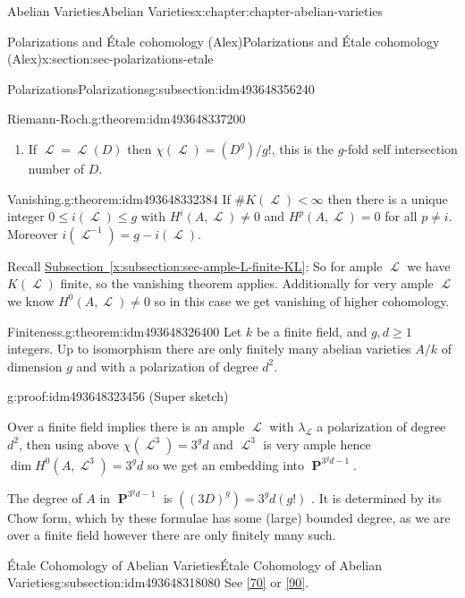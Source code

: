\documentclass[oneside,10pt,]{book}
\numberwithin{equation}{section}
\newcommand{\sheaf}[1]{\operatorname{\mathcal{#1}}}
\DeclareMathOperator{\PP}{\mathbf{P}}
\newcommand{\lt}{<}
\begin{document}
\begin{chapterptx}{Abelian Varieties}{}{Abelian Varieties}{}{}{x:chapter:chapter-abelian-varieties}
\begin{sectionptx}{Polarizations and Étale cohomology (Alex)}{}{Polarizations and Étale cohomology (Alex)}{}{}{x:section:sec-polarizations-etale}
\begin{subsectionptx}{Polarizations}{}{Polarizations}{}{}{g:subsection:idm493648356240}
\begin{theorem}{Riemann-Roch.}{}{g:theorem:idm493648337200}
\begin{enumerate}
\item{}If \(\sheaf L = \sheaf L(D)\) then \(\chi(\sheaf L) = (D^g)/g!\), this is the \(g\)-fold self intersection number of \(D\).%
\end{enumerate}
%
\end{theorem}
\begin{theorem}{Vanishing.}{}{g:theorem:idm493648332384}%
If \(\#K( \sheaf L)\lt \infty\) then there is a unique integer \(0\le i(\sheaf L) \le g\) with \(H^i(A, \sheaf L) \ne  0\) and \(H^p(A, \sheaf L) = 0\) for all \(p \ne i\). Moreover \(i(\sheaf L^{-1}) = g - i(\sheaf L)\).%
\end{theorem}
Recall \hyperref[x:subsection:sec-ample-L-finite-KL]{Subsection~\ref{x:subsection:sec-ample-L-finite-KL}}: So for ample \(\sheaf L\) we have \(K(\sheaf L)\) finite, so the vanishing theorem applies. Additionally for very ample \(\sheaf L\) we know \(H^0(A,\sheaf L) \ne 0\) so in this case we get vanishing of higher cohomology.%
\begin{theorem}{Finiteness.}{}{g:theorem:idm493648326400}%
Let \(k\) be a finite field, and   \(g,d\ge 1\) integers. Up to isomorphism there are only finitely many abelian varieties \(A/k\) of dimension \(g\) and with a polarization of degree \(d^2\).%
\end{theorem}
\begin{proofptx}{}{g:proof:idm493648323456}
(Super sketch)%
\par
Over a finite field implies there is an ample \(\sheaf L\) with \(\lambda_{\sheaf L}\) a polarization of degree \(d^2\), then using above \(\chi(\sheaf L^3) = 3^g d\) and \(\sheaf L^3\) is very ample hence \(\dim H^0(A, \sheaf L^3) = 3^g d\) so we get an embedding into \(\PP^{3^g d - 1}\).%
\par
The degree of \(A\) in \(\PP^{3^g d - 1}\) is \(((3D)^g) = 3^g d(g!)\) . It is determined by its Chow form, which by these formulae has some (large) bounded degree, as we are over a finite field however there are only finitely many such.%
\end{proofptx}
\end{subsectionptx}
%
%
\typeout{************************************************}
\typeout{************************************************}
%
\begin{subsectionptx}{Étale Cohomology of Abelian Varieties}{}{Étale Cohomology of Abelian Varieties}{}{}{g:subsection:idm493648318080}
See \hyperlink{x:biblio:bib-milne-etale}{[70]} or \hyperlink{x:biblio:bib-tamme}{[90]}.%

\end{subsectionptx}
\end{sectionptx}
\end{chapterptx}
\end{document}
